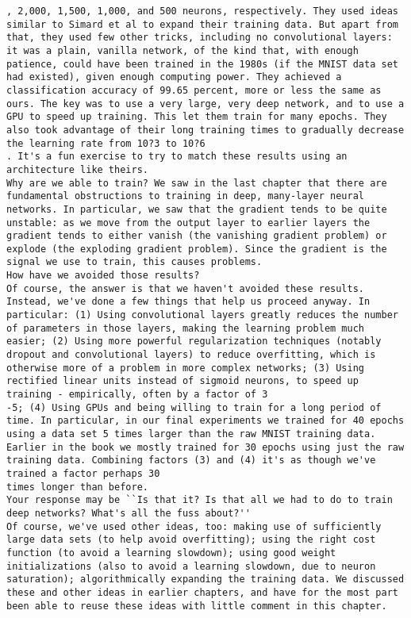 \begin{lstlisting}
, 2,000, 1,500, 1,000, and 500 neurons, respectively. They used ideas similar to Simard et al to expand their training data. But apart from that, they used few other tricks, including no convolutional layers: it was a plain, vanilla network, of the kind that, with enough patience, could have been trained in the 1980s (if the MNIST data set had existed), given enough computing power. They achieved a classification accuracy of 99.65 percent, more or less the same as ours. The key was to use a very large, very deep network, and to use a GPU to speed up training. This let them train for many epochs. They also took advantage of their long training times to gradually decrease the learning rate from 10?3 to 10?6
. It's a fun exercise to try to match these results using an architecture like theirs.
Why are we able to train? We saw in the last chapter that there are fundamental obstructions to training in deep, many-layer neural networks. In particular, we saw that the gradient tends to be quite unstable: as we move from the output layer to earlier layers the gradient tends to either vanish (the vanishing gradient problem) or explode (the exploding gradient problem). Since the gradient is the signal we use to train, this causes problems.
How have we avoided those results? 
Of course, the answer is that we haven't avoided these results. Instead, we've done a few things that help us proceed anyway. In particular: (1) Using convolutional layers greatly reduces the number of parameters in those layers, making the learning problem much easier; (2) Using more powerful regularization techniques (notably dropout and convolutional layers) to reduce overfitting, which is otherwise more of a problem in more complex networks; (3) Using rectified linear units instead of sigmoid neurons, to speed up training - empirically, often by a factor of 3
-5; (4) Using GPUs and being willing to train for a long period of time. In particular, in our final experiments we trained for 40 epochs using a data set 5 times larger than the raw MNIST training data. Earlier in the book we mostly trained for 30 epochs using just the raw training data. Combining factors (3) and (4) it's as though we've trained a factor perhaps 30
times longer than before.
Your response may be ``Is that it? Is that all we had to do to train deep networks? What's all the fuss about?''
Of course, we've used other ideas, too: making use of sufficiently large data sets (to help avoid overfitting); using the right cost function (to avoid a learning slowdown); using good weight initializations (also to avoid a learning slowdown, due to neuron saturation); algorithmically expanding the training data. We discussed these and other ideas in earlier chapters, and have for the most part been able to reuse these ideas with little comment in this chapter.

\end{lstlisting}
